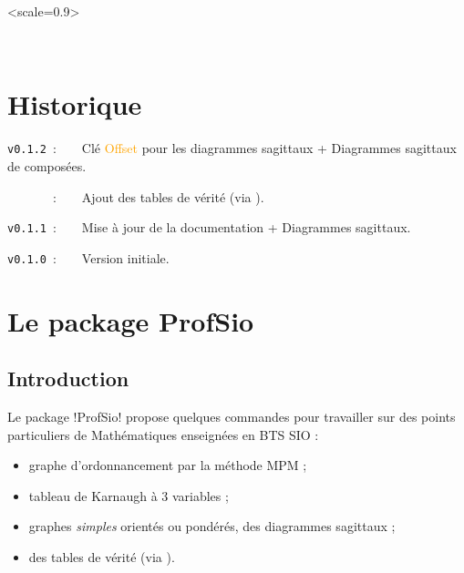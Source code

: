 \documentclass[french,a4paper,11pt]{article}
\providecommand\tikzlogo{Ti\textit{k}Z}
\providecommand\TeXLive{\TeX{}Live\xspace}
\let\TikZ\tikzlogo
\newcommand\TableauDocumentation{%
	\begin{tblr}{width=\linewidth,colspec={X[c]X[c]X[c]X[c]X[c]X[c]},cells={font=\large\sffamily}}
		{\LaTeX} & {\hologo{pdfLaTeX}} & {\hologo{LuaLaTeX}} & {\TikZ} & {\TeXLive} & {\hologo{MiKTeX}} \\
	\end{tblr}
}
\newcommand\Cle[1]{{\small\sffamily\textlangle \textcolor{orange}{#1}\textrangle}}
\begin{document}
{{\vspace{0.5cm}

\hfill
\begin{GrapheTikz}[Unite=0.75cm,CouleurSommets={gray/blue},Epaisseur={very thick/thick},CouleurFleches=orange]<scale=0.9>
\end{GrapheTikz}
\hfill~
\hfill~


%
%
%
%
%

\newpage

\hypertarget{matoc}{}

\tableofcontents

\vfill

\newpage

\section{Historique}

\verb|v0.1.2|~:~~~~Clé \Cle{Offset} pour les diagrammes sagittaux + Diagrammes sagittaux de composées.

\verb|      |~:~~~~Ajout des tables de vérité (via ).

\verb|v0.1.1|~:~~~~Mise à jour de la documentation + Diagrammes sagittaux.

\verb|v0.1.0|~:~~~~Version initiale.

\newpage

\section{Le package ProfSio}

\subsection{Introduction}

\begin{noteblock}
Le package \packagetex!ProfSio! propose quelques commandes pour travailler sur des points particuliers de Mathématiques enseignées en BTS SIO :

\begin{itemize}
	\item graphe d'ordonnancement par la méthode MPM ;
	\item tableau de Karnaugh à 3 variables ;
	\item graphes \textit{simples} orientés ou pondérés, des diagrammes sagittaux ;
	\item des tables de vérité (via ).
\end{itemize}
\vspace*{-\baselineskip}\leavevmode
\end{noteblock}

}}
\end{document}
